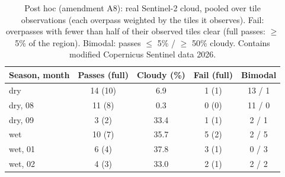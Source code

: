 \begin{table}[H]
\centering
\footnotesize
\renewcommand{\arraystretch}{1.2}
\setlength{\tabcolsep}{3pt}
\caption{Post hoc (amendment A8): real Sentinel-2 cloud, pooled over tile observations (each overpass weighted by the tiles it observes). Fail: overpasses with fewer than half of their observed tiles clear (full passes: $\geq$ 5\% of the region). Bimodal: passes $\leq$ 5\% / $\geq$ 50\% cloudy. Contains modified Copernicus Sentinel data 2026.}
\label{tab:a8_pooled}
\begin{tabular}{|l|c|c|c|c|}
\hline
Season, month & Passes (full) & Cloudy (\%) & Fail (full) & Bimodal \\
\hline
dry & 14 (10) & 6.9 & 1 (1) & 13 / 1 \\
\hline
dry, 08 & 11 (8) & 0.3 & 0 (0) & 11 / 0 \\
\hline
dry, 09 & 3 (2) & 33.4 & 1 (1) & 2 / 1 \\
\hline
wet & 10 (7) & 35.7 & 5 (2) & 2 / 5 \\
\hline
wet, 01 & 6 (4) & 37.8 & 3 (1) & 0 / 3 \\
\hline
wet, 02 & 4 (3) & 33.0 & 2 (1) & 2 / 2 \\
\hline
\end{tabular}
\end{table}
